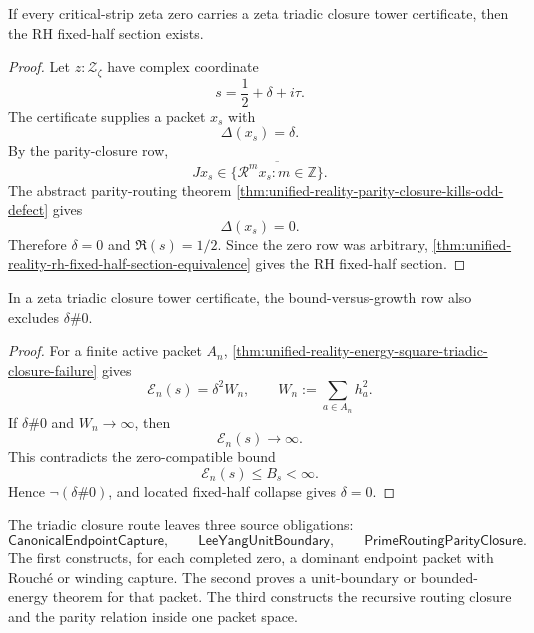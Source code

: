 \begin{theorem}
\label{thm:unified-reality-triadic-closure-tower-certificates-conditionally-sufficient}
If every critical-strip zeta zero carries a zeta triadic closure tower
certificate, then the RH fixed-half section exists.
\end{theorem}

\begin{proof}
Let $z:\mathcal Z_{\zeta}$ have complex coordinate
$$
s=\frac12+\delta+i\tau.
$$
The certificate supplies a packet $x_s$ with
$$
\Delta(x_s)=\delta.
$$
By the parity-closure row,
$$
Jx_s\in\overline{\{\mathcal R^m x_s:m\in\mathbb Z\}}.
$$
The abstract parity-routing theorem
\autoref{thm:unified-reality-parity-closure-kills-odd-defect} gives
$$
\Delta(x_s)=0.
$$
Therefore $\delta=0$ and $\Re(s)=1/2$.  Since the zero row was arbitrary,
\autoref{thm:unified-reality-rh-fixed-half-section-equivalence} gives
the RH fixed-half section.
\end{proof}

\begin{corollary}
\label{cor:unified-reality-triadic-energy-gives-same-contradiction}
In a zeta triadic closure tower certificate, the bound-versus-growth row
also excludes $\delta\#0$.
\end{corollary}

\begin{proof}
For a finite active packet $A_n$,
\autoref{thm:unified-reality-energy-square-triadic-closure-failure}
gives
$$
\mathcal E_n(s)=\delta^2W_n,
\qquad
W_n:=\sum_{a\in A_n}h_a^2.
$$
If $\delta\#0$ and $W_n\to\infty$, then
$$
\mathcal E_n(s)\to\infty.
$$
This contradicts the zero-compatible bound
$$
\mathcal E_n(s)\le B_s<\infty.
$$
Hence $\neg(\delta\#0)$, and located fixed-half collapse gives
$\delta=0$.
\end{proof}

\begin{definition}
\label{def:unified-reality-triadic-closure-source-obligations}
The triadic closure route leaves three source obligations:
$$
\mathsf{CanonicalEndpointCapture},
\qquad
\mathsf{LeeYangUnitBoundary},
\qquad
\mathsf{PrimeRoutingParityClosure}.
$$
The first constructs, for each completed zero, a dominant endpoint packet
with Rouch\'e or winding capture.  The second proves a unit-boundary or
bounded-energy theorem for that packet.  The third constructs the
recursive routing closure and the parity relation inside one packet
space.
\end{definition}

